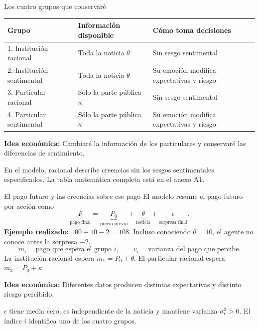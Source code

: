 \documentclass[aspectratio=169,11pt]{beamer}
\newcommand{\idea}[1]{\par\medskip\textbf{Idea económica:} #1}
\begin{document}
\begin{frame}{Los cuatro grupos que conservaré}
 \begin{center}
 \begin{tabular}{p{4.1cm}p{3.6cm}p{4.4cm}}
 \toprule
 Grupo & Información disponible & Cómo toma decisiones\\
 \midrule
 1. Institución racional & Toda la noticia \(\theta\) & Sin sesgo sentimental\\[0.15cm]
 2. Institución sentimental & Toda la noticia \(\theta\) & Su emoción modifica expectativas y riesgo\\[0.15cm]
 3. Particular racional & Sólo la parte pública \(\kappa\) & Sin sesgo sentimental\\[0.15cm]
 4. Particular sentimental & Sólo la parte pública \(\kappa\) & Su emoción modifica expectativas y riesgo\\
 \bottomrule
 \end{tabular}
 \end{center}
 \idea{Cambiaré la información de los particulares y conservaré las diferencias de sentimiento.}
 \medskip\par\small
 En el modelo, racional describe creencias sin los sesgos sentimentales
 especificados. La tabla matemática completa está en el anexo A1.
\end{frame}
\begin{frame}{El pago futuro y las creencias sobre ese pago}
 El modelo resume el pago futuro por acción como
 \[
  \underbrace{F}_{\text{pago final}}
  =\underbrace{P_0}_{\text{precio previo}}
   +\underbrace{\theta}_{\text{noticia}}
   +\underbrace{\epsilon}_{\text{sorpresa final}}.
 \]
 \textbf{Ejemplo realizado:} \(100+10-2=108\).
 Incluso conociendo \(\theta=10\), el agente no conoce antes la sorpresa \(-2\).
 \[
  m_i=\text{pago que espera el grupo }i,\qquad
  v_i=\text{varianza del pago que percibe}.
 \]
 La institución racional espera \(m_1=P_0+\theta\).
 El particular racional espera \(m_3=P_0+\kappa\).
 \idea{Diferentes datos producen distintas expectativas y distinto riesgo percibido.}
 \medskip\par\small
 \(\epsilon\) tiene media cero, es independiente de la noticia y mantiene
 varianza \(\sigma_\epsilon^2>0\). El índice \(i\) identifica uno de los cuatro grupos.
\end{frame}
\end{document}
